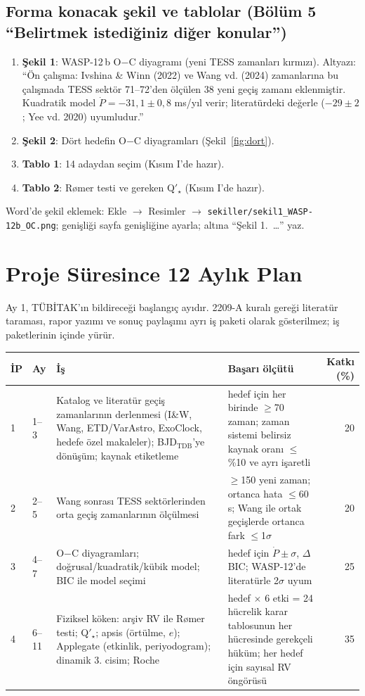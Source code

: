 \subsection{Forma konacak şekil ve tablolar (Bölüm 5 “Belirtmek istediğiniz diğer konular”)}
\begin{enumerate}[leftmargin=*]
\item \textbf{Şekil 1}: WASP-12\,b O$-$C diyagramı (yeni TESS zamanları kırmızı). Altyazı: “Ön çalışma: Ivshina \& Winn
      (2022) ve Wang vd. (2024) zamanlarına bu çalışmada TESS sektör 71–72'den ölçülen 38 yeni geçiş zamanı eklenmiştir.
      Kuadratik model $\dot P = -31{,}1\pm0{,}8$ ms/yıl verir; literatürdeki değerle ($-29\pm2$; Yee vd. 2020) uyumludur.”
\item \textbf{Şekil 2}: Dört hedefin O$-$C diyagramları (Şekil~\ref{fig:dort}).
\item \textbf{Tablo 1}: 14 adaydan seçim (Kısım I'de hazır).
\item \textbf{Tablo 2}: Rømer testi ve gereken Q$'_\star$ (Kısım I'de hazır).
\end{enumerate}
Word'de şekil eklemek: Ekle $\rightarrow$ Resimler $\rightarrow$ \texttt{sekiller/sekil1\_WASP-12b\_OC.png};
genişliği sayfa genişliğine ayarla; altına “Şekil 1.~\dots” yaz.

\section{Proje Süresince 12 Aylık Plan}
\label{sec:plan}
Ay 1, TÜBİTAK'ın bildireceği başlangıç ayıdır. 2209-A kuralı gereği literatür taraması, rapor yazımı ve sonuç paylaşımı
ayrı iş paketi olarak gösterilmez; iş paketlerinin içinde yürür.

\begin{center}
\small
\begin{tabularx}{\textwidth}{l l >{\raggedright\arraybackslash}X >{\raggedright\arraybackslash}X r}
\toprule
İP & Ay & İş & Başarı ölçütü & Katkı (\%)\\
\midrule
1 & 1–3 & Katalog ve literatür geçiş zamanlarının derlenmesi (I\&W, Wang, ETD/VarAstro, ExoClock, hedefe özel makaleler); BJD$_\mathrm{TDB}$'ye dönüşüm; kaynak etiketleme &
  4 hedef için her birinde $\ge$70 zaman; zaman sistemi belirsiz kaynak oranı $\le$\%10 ve ayrı işaretli & 20\\
2 & 2–5 & Wang sonrası TESS sektörlerinden orta geçiş zamanlarının ölçülmesi & $\ge$150 yeni zaman; ortanca hata $\le$60 s; Wang ile ortak geçişlerde ortanca fark $\le$1$\sigma$ & 20\\
3 & 4–7 & O$-$C diyagramları; doğrusal/kuadratik/kübik model; BIC ile model seçimi &
  4 hedef için $\dot P\pm\sigma$, $\Delta$BIC; WASP-12'de literatürle 2$\sigma$ uyum & 25\\
4 & 6–11 & Fiziksel köken: arşiv RV ile Rømer testi; Q$'_\star$; apsis (örtülme, $e$); Applegate (etkinlik, periyodogram); dinamik 3. cisim; Roche &
  4 hedef $\times$ 6 etki = 24 hücrelik karar tablosunun her hücresinde gerekçeli hüküm; her hedef için sayısal RV öngörüsü & 35\\
\bottomrule
\end{tabularx}
\end{center}

